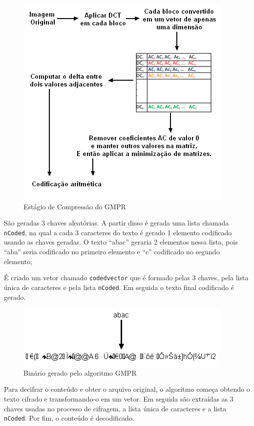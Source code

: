 \begin{figure}[t]
    \centering
    \includegraphics{Images/GMPRCompression.png}
    \caption{Estágio de Compressão do GMPR}
    \label{fig:gmprcompression}
\end{figure}

São geradas 3 chaves aleatórias. A partir disso é gerada uma lista chamada \texttt{nCoded}, na qual a cada 3 caracteres do texto é gerado 1 elemento codificado usando as chaves geradas. O texto ``abac'' geraria 2 elementos nessa lista, pois ``aba'' seria codificado no primeiro elemento e ``c'' codificado no segundo elemento;

É criado um vetor chamado \texttt{codedvector} que é formado pelas 3 chaves, pela lista única de caracteres e pela lista \texttt{nCoded}. Em seguida o texto final codificado é gerado.

\begin{figure}[t]
    \centering
    \includegraphics{Images/CifraGMPR.jpg}
    \caption{Binário gerado pelo algoritmo GMPR}\label{fig:gmpr}
\end{figure}

Para decifrar o conteúdo e obter o arquivo original, o algoritmo começa obtendo o texto cifrado e transformando-o em um vetor. Em seguida são extraídas as 3 chaves usadas no processo de cifragem, a lista única de caracteres e a lista \texttt{nCoded}. Por fim, o conteúdo é decodificado.

